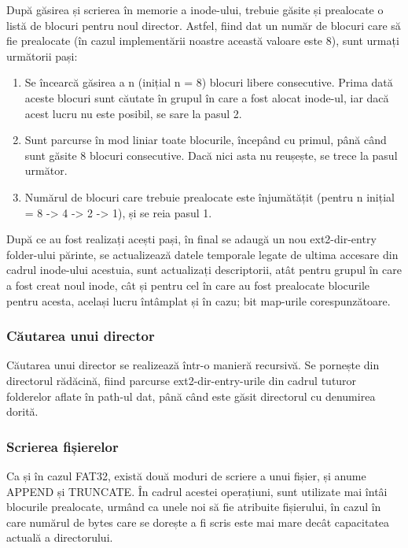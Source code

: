 După găsirea și scrierea în memorie a inode-ului, trebuie găsite și prealocate o listă de blocuri pentru noul director. Astfel, fiind dat un număr de blocuri care să fie prealocate (în cazul implementării noastre această valoare este 8), sunt urmați următorii pași:

  \begin{enumerate}
      \item Se încearcă găsirea a n (inițial n = 8) blocuri libere consecutive. Prima dată aceste blocuri sunt căutate în grupul în care a fost alocat inode-ul, iar dacă acest lucru nu este posibil, se sare la pasul 2.
      
      \item Sunt parcurse în mod liniar toate blocurile, începând cu primul, până când sunt găsite 8 blocuri consecutive. Dacă nici asta nu reușește, se trece la pasul următor.

      \item Numărul de blocuri care trebuie prealocate este înjumătățit (pentru n inițial = 8 -> 4 -> 2 -> 1), și se reia pasul 1.
  \end{enumerate}

După ce au fost realizați acești pași, în final se adaugă un nou ext2-dir-entry folder-ului părinte, se actualizează datele temporale legate de ultima accesare din cadrul inode-ului acestuia, sunt actualizați descriptorii, atât pentru grupul în care a fost creat noul inode, cât și pentru cel în care au fost prealocate blocurile pentru acesta, același lucru întâmplat și în cazu; bit map-urile corespunzătoare.

\subsubsection{Căutarea unui director}

Căutarea unui director se realizează într-o manieră recursivă. Se pornește din directorul rădăcină, fiind parcurse ext2-dir-entry-urile din cadrul tuturor folderelor aflate în path-ul dat, până când este găsit directorul cu denumirea dorită.

\subsubsection{Scrierea fișierelor}

Ca și în cazul FAT32, există două moduri de scriere a unui fișier, și anume APPEND și TRUNCATE. În cadrul acestei operațiuni, sunt utilizate mai întâi blocurile prealocate, urmând ca unele noi să fie atribuite fișierului, în cazul în care numărul de bytes care se dorește a fi scris este mai mare decât capacitatea actuală a directorului.

